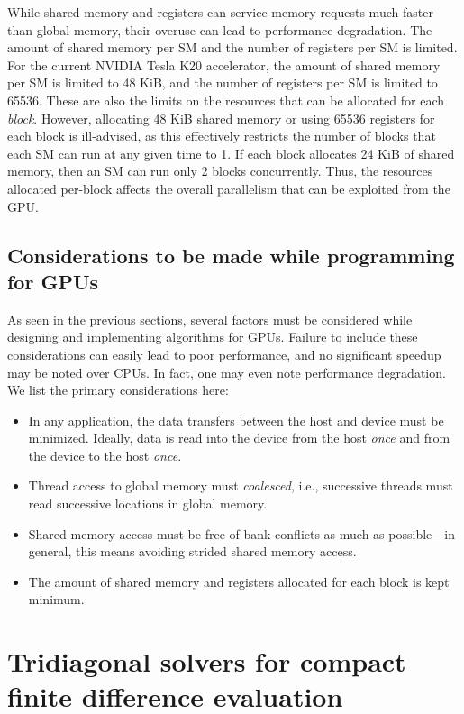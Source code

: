 While shared memory and registers can service memory requests
much faster than global memory,
their overuse can lead to performance degradation.
The amount of shared memory per SM
and the number of registers per SM is limited.
For the current NVIDIA Tesla K20 accelerator,
the amount of shared memory per SM is limited to 48 KiB,
and the number of registers per SM is limited to 65536.
These are also the limits
on the resources that can be allocated for each \emph{block}.
However,
allocating 48 KiB shared memory or using 65536 registers 
for each block is ill-advised,
as this effectively restricts the number of blocks that
each SM can run at any given time to 1.
If each block allocates 24 KiB of shared memory,
then an SM can run only 2 blocks concurrently.
Thus, the resources allocated per-block affects
the overall parallelism that can be exploited from the GPU.

\subsection{Considerations to be made while programming for GPUs}

As seen in the previous sections,
several factors must be considered while
designing and implementing algorithms for GPUs.
Failure to include these considerations can easily
lead to poor performance,
and no significant speedup may be noted over CPUs.
In fact, one may even note performance degradation.
We list the primary considerations here:

\begin{itemize}
    \item In any application, the data transfers between
        the host and device must be minimized.
        Ideally,
        data is read into the device from the host \emph{once}
        and from the device to the host \emph{once}.
    \item Thread access to global memory must \emph{coalesced},
        i.e., successive threads must read successive locations
        in global memory.
    \item Shared memory access must be free of bank conflicts
        as much as possible---in general, this means avoiding
        strided shared memory access.
    \item The amount of shared memory and registers
        allocated for each block is kept minimum.
\end{itemize}

\section{Tridiagonal solvers for compact finite difference evaluation}

